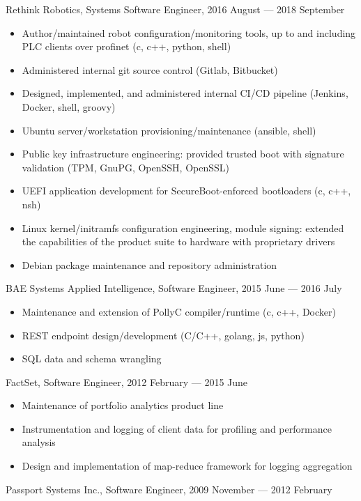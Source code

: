 \documentclass[letterpaper,12pt]{article}
\begin{document}
Rethink Robotics, Systems Software Engineer, 2016 August --- 2018 September

\begin{itemize}
\item Author/maintained robot configuration/monitoring tools, up to and
  including PLC clients over profinet (c, c++, python, shell)
\item Administered internal git source control (Gitlab, Bitbucket)
\item Designed, implemented, and administered internal CI/CD pipeline (Jenkins,
  Docker, shell, groovy)
\item Ubuntu server/workstation provisioning/maintenance (ansible, shell)
\item Public key infrastructure engineering: provided trusted boot with
  signature validation (TPM, GnuPG, OpenSSH, OpenSSL)
\item UEFI application development for SecureBoot-enforced bootloaders (c, c++,
  nsh)
\item Linux kernel/initramfs configuration engineering, module signing:
  extended the capabilities of the product suite to hardware with proprietary
  drivers
\item Debian package maintenance and repository administration
\end{itemize}

BAE Systems Applied Intelligence, Software Engineer, 2015 June --- 2016 July

\begin{itemize}
\item Maintenance and extension of PollyC compiler/runtime (c, c++, Docker)
\item REST endpoint design/development (C/C++, golang, js, python)
\item SQL data and schema wrangling
\end{itemize}

FactSet, Software Engineer, 2012 February --- 2015 June

\begin{itemize}
\item Maintenance of portfolio analytics product line
\item Instrumentation and logging of client data for profiling and performance analysis
\item Design and implementation of map-reduce framework for logging aggregation
\end{itemize}

Passport Systems Inc., Software Engineer, 2009 November --- 2012 February
\end{document}
